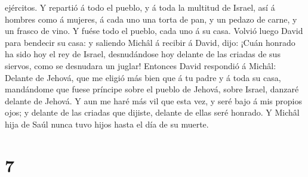 ejércitos.  Y repartió á todo el pueblo, y á toda la
multitud de Israel, así á hombres como á mujeres, á cada uno una torta
de pan, y un pedazo de carne, y un frasco de vino. Y fuése todo el
pueblo, cada uno á su casa.  Volvió luego David para
bendecir su casa: y saliendo Michâl á recibir á David, dijo: ¡Cuán
honrado ha sido hoy el rey de Israel, desnudándose hoy delante de las
criadas de sus siervos, como se desnudara un juglar! 
Entonces David respondió á Michâl: Delante de Jehová, que me eligió más
bien que á tu padre y á toda su casa, mandándome que fuese príncipe
sobre el pueblo de Jehová, sobre Israel, danzaré delante de Jehová.
 Y aun me haré más vil que esta vez, y seré bajo á mis
propios ojos; y delante de las criadas que dijiste, delante de ellas
seré honrado.  Y Michâl hija de Saúl nunca tuvo hijos hasta
el día de su muerte.

\hypertarget{section-6}{%
\section{7}\label{section-6}}

